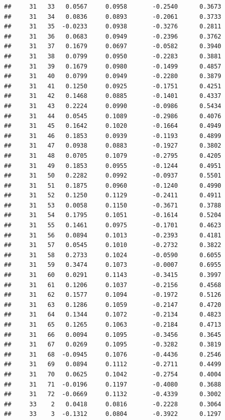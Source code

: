 \documentclass[
]{article}
\begin{document}
\begin{verbatim}
##     31   33   0.0567     0.0958       -0.2540      0.3673 
##     31   34   0.0836     0.0893       -0.2061      0.3733 
##     31   35  -0.0233     0.0938       -0.3276      0.2811 
##     31   36   0.0683     0.0949       -0.2396      0.3762 
##     31   37   0.1679     0.0697       -0.0582      0.3940 
##     31   38   0.0799     0.0950       -0.2283      0.3881 
##     31   39   0.1679     0.0980       -0.1499      0.4857 
##     31   40   0.0799     0.0949       -0.2280      0.3879 
##     31   41   0.1250     0.0925       -0.1751      0.4251 
##     31   42   0.1468     0.0885       -0.1401      0.4337 
##     31   43   0.2224     0.0990       -0.0986      0.5434 
##     31   44   0.0545     0.1089       -0.2986      0.4076 
##     31   45   0.1642     0.1020       -0.1664      0.4949 
##     31   46   0.1853     0.0939       -0.1193      0.4899 
##     31   47   0.0938     0.0883       -0.1927      0.3802 
##     31   48   0.0705     0.1079       -0.2795      0.4205 
##     31   49   0.1853     0.0955       -0.1244      0.4951 
##     31   50   0.2282     0.0992       -0.0937      0.5501 
##     31   51   0.1875     0.0960       -0.1240      0.4990 
##     31   52   0.1250     0.1129       -0.2411      0.4911 
##     31   53   0.0058     0.1150       -0.3671      0.3788 
##     31   54   0.1795     0.1051       -0.1614      0.5204 
##     31   55   0.1461     0.0975       -0.1701      0.4623 
##     31   56   0.0894     0.1013       -0.2393      0.4181 
##     31   57   0.0545     0.1010       -0.2732      0.3822 
##     31   58   0.2733     0.1024       -0.0590      0.6055 
##     31   59   0.3474     0.1073       -0.0007      0.6955 
##     31   60   0.0291     0.1143       -0.3415      0.3997 
##     31   61   0.1206     0.1037       -0.2156      0.4568 
##     31   62   0.1577     0.1094       -0.1972      0.5126 
##     31   63   0.1286     0.1059       -0.2147      0.4720 
##     31   64   0.1344     0.1072       -0.2134      0.4823 
##     31   65   0.1265     0.1063       -0.2184      0.4713 
##     31   66   0.0094     0.1095       -0.3456      0.3645 
##     31   67   0.0269     0.1095       -0.3282      0.3819 
##     31   68  -0.0945     0.1076       -0.4436      0.2546 
##     31   69   0.0894     0.1112       -0.2711      0.4499 
##     31   70   0.0625     0.1042       -0.2754      0.4004 
##     31   71  -0.0196     0.1197       -0.4080      0.3688 
##     31   72  -0.0669     0.1132       -0.4339      0.3002 
##     33    2   0.0418     0.0816       -0.2228      0.3064 
##     33    3  -0.1312     0.0804       -0.3922      0.1297 

\end{verbatim}
\end{document}
